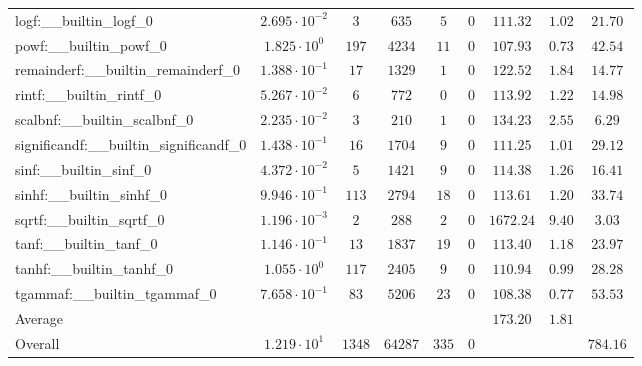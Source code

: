 \begin{tabular}{|l|c|c|c|c|c|c|c|c|}
logf:\_\_builtin\_logf\_0                 & $ 2.695 \cdot 10^{-2} $ & $ 3      $ & $ 635   $ & $ 5   $ & $ 0   $ & $ 111.32      $ & $ 1.02    $ & $ 21.70   $ \\
powf:\_\_builtin\_powf\_0                 & $ 1.825 \cdot 10^{0}  $ & $ 197    $ & $ 4234  $ & $ 11  $ & $ 0   $ & $ 107.93      $ & $ 0.73    $ & $ 42.54   $ \\
remainderf:\_\_builtin\_remainderf\_0     & $ 1.388 \cdot 10^{-1} $ & $ 17     $ & $ 1329  $ & $ 1   $ & $ 0   $ & $ 122.52      $ & $ 1.84    $ & $ 14.77   $ \\
rintf:\_\_builtin\_rintf\_0               & $ 5.267 \cdot 10^{-2} $ & $ 6      $ & $ 772   $ & $ 0   $ & $ 0   $ & $ 113.92      $ & $ 1.22    $ & $ 14.98   $ \\
scalbnf:\_\_builtin\_scalbnf\_0           & $ 2.235 \cdot 10^{-2} $ & $ 3      $ & $ 210   $ & $ 1   $ & $ 0   $ & $ 134.23      $ & $ 2.55    $ & $ 6.29    $ \\
significandf:\_\_builtin\_significandf\_0 & $ 1.438 \cdot 10^{-1} $ & $ 16     $ & $ 1704  $ & $ 9   $ & $ 0   $ & $ 111.25      $ & $ 1.01    $ & $ 29.12   $ \\
sinf:\_\_builtin\_sinf\_0                 & $ 4.372 \cdot 10^{-2} $ & $ 5      $ & $ 1421  $ & $ 9   $ & $ 0   $ & $ 114.38      $ & $ 1.26    $ & $ 16.41   $ \\
sinhf:\_\_builtin\_sinhf\_0               & $ 9.946 \cdot 10^{-1} $ & $ 113    $ & $ 2794  $ & $ 18  $ & $ 0   $ & $ 113.61      $ & $ 1.20    $ & $ 33.74   $ \\
sqrtf:\_\_builtin\_sqrtf\_0               & $ 1.196 \cdot 10^{-3} $ & $ 2      $ & $ 288   $ & $ 2   $ & $ 0   $ & $ 1672.24     $ & $ 9.40    $ & $ 3.03    $ \\
tanf:\_\_builtin\_tanf\_0                 & $ 1.146 \cdot 10^{-1} $ & $ 13     $ & $ 1837  $ & $ 19  $ & $ 0   $ & $ 113.40      $ & $ 1.18    $ & $ 23.97   $ \\
tanhf:\_\_builtin\_tanhf\_0               & $ 1.055 \cdot 10^{0}  $ & $ 117    $ & $ 2405  $ & $ 9   $ & $ 0   $ & $ 110.94      $ & $ 0.99    $ & $ 28.28   $ \\
tgammaf:\_\_builtin\_tgammaf\_0           & $ 7.658 \cdot 10^{-1} $ & $ 83     $ & $ 5206  $ & $ 23  $ & $ 0   $ & $ 108.38      $ & $ 0.77    $ & $ 53.53   $ \\
\hline
Average                                   & $                     $ & $        $ & $       $ & $     $ & $     $ & $ 173.20      $ & $ 1.81    $ & $         $ \\
\hline
Overall                                   & $ 1.219 \cdot 10^{1}  $ & $ 1348   $ & $ 64287 $ & $ 335 $ & $ 0   $ & $             $ & $         $ & $ 784.16  $ \\
\hline
\end{tabular}
